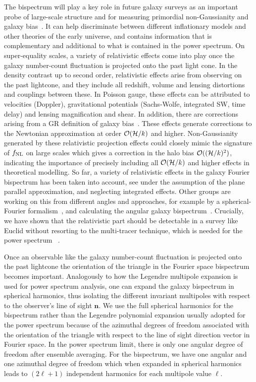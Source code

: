 The bispectrum will play a key role in future galaxy surveys as an  important probe of large-scale structure and for measuring primordial 
non-Gaussianity and galaxy bias~\cite{Jeong:2009vd,Baldauf:2010vn,Celoria:2018euj}. It can help discriminate between different inflationary models and other theories of the early universe, and contains information that is complementary and additional to what is contained in the power spectrum. 
On super-equality scales, a variety of relativistic effects come into play once the galaxy number-count fluctuation is projected onto the past light cone. In the density contrast up to second order, relativistic effects arise from observing on the past lightcone, and they include all redshift, volume and lensing distortions and couplings between these. In Poisson gauge, these effects can be attributed to velocities (Doppler), gravitational potentials (Sachs-Wolfe, integrated SW, time delay) and lensing magnification and shear. In addition, there are corrections arising from a GR definition of galaxy bias~\cite{Bertacca:2014wga}. These effects generate corrections to the Newtonian approximation at order $\mathcal{O}(\mathcal{H}/k)$ and higher. Non-Gaussianity generated by these relativistic projection effects could closely mimic the signature of \(f_\text{NL}\) on large scales which gives a correction in the halo bias $\mathcal{O}((\mathcal{H}/k)^2)$, indicating the importance of precisely including all $\mathcal{O}(\mathcal{H}/k)$ and higher effects in theoretical modelling. So far, a variety of relativistic effects in the galaxy Fourier bispectrum has been taken into account, see 
\cite{Umeh:2016nuh,Jolicoeur:2017nyt,Jolicoeur:2017eyi,Jolicoeur:2018blf,Clarkson:2018dwn,Maartens:2019yhx} under the assumption of the plane parallel approximation, and neglecting integrated effects. Other groups are working on this from different angles and approaches, for example by a spherical-Fourier formalism~\cite{Bertacca:2017dzm}, and calculating the angular galaxy bispectrum~\cite{DiDio:2016gpd,DiDio:2018unb}. Crucially, we have shown that the relativistic part should be detectable in a survey like Euclid without resorting to the multi-tracer technique, which is needed for the power spectrum~\cite{Maartens:2019yhx} . 

Once an observable like the galaxy number-count fluctuation is projected onto the past lightcone the orientation of the triangle in the Fourier space bispectrum becomes important. 
Analogously to how the Legendre multipole expansion is used for power spectrum analysis, one can expand the galaxy bispectrum in spherical harmonics, thus isolating the different invariant multipoles with respect to the observer's line of sight $\bm n$. We use the full spherical harmonics for the bispectrum rather than the Legendre polynomial expansion usually adopted for the power spectrum because of the azimuthal degrees of freedom associated with the orientation of the triangle with respect to the line of sight direction vector in Fourier space. In the power spectrum limit, there is only one angular degree of freedom after ensemble averaging. For the bispectrum, we have one angular and one azimuthal degree of freedom which when expanded in spherical harmonics leads to $(2\ell + 1)$ independent harmonics for each multipole value $\ell$. 

